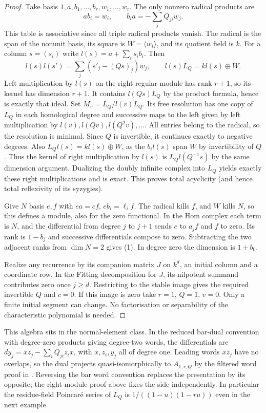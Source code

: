 \documentclass[11pt]{article}
\begin{document}
\begin{proof}
Take basis $1,a,b_1,\ldots,b_r,w_1,\ldots,w_r$. The only nonzero
radical products are
\[
              a b_i=w_i,\qquad b_i a=-\sum_j Q_{ji}w_j .
\]
This table is associative since all triple radical products vanish.
The radical is the span of the nonunit basis, its square is
$W=\langle w_i\rangle$, and its quotient field is $k$.
For a column $s=(s_i)$ write $l(s)=a+\sum_i s_i b_i$. Then
\[
 l(s)l(s')=\sum_j(s'_j-(Qs)_j)w_j,\qquad
 l(s)L_Q=k l(s)\oplus W.
\]
Left multiplication by $l(s)$ on the right regular module has rank
$r+1$, so its kernel has dimension $r+1$. It contains
$l(Qs)L_Q$ by the product formula, hence is exactly that ideal.
Set $M_v=L_Q/l(v)L_Q$. Its free resolution has one copy of $L_Q$
in each homological degree and successive maps to the left given
by left multiplication by $l(v),l(Qv),l(Q^2v),\ldots$.
All entries belong to the radical, so the resolution is minimal.
Since $Q$ is invertible, it continues exactly to negative degrees.
Also $L_Q l(s)=k l(s)\oplus W$, as the $b_i l(s)$ span $W$ by
invertibility of $Q$. Thus the kernel of right multiplication by
$l(s)$ is $L_Q l(Q^{-1}s)$ by the same dimension argument.
Dualizing the doubly infinite complex into $L_Q$ yields exactly
these right multiplications and is exact. This proves total acyclicity
(and hence total reflexivity of its syzygies).

Give $N$ basis $e,f$ with $e a=c f$, $e b_i=\ell_i f$.
The radical kills $f$, and $W$ kills $N$, so this defines a module,
also for the zero functional. In the Hom complex each term is $N$,
and the differential from degree $j$ to $j+1$ sends $e$ to $a_jf$
and $f$ to zero. Its rank is $1-b_j$ and successive differentials
compose to zero. Subtracting the two adjacent ranks from $\dim N=2$
gives (1). In degree zero the dimension is $1+b_0$.

Realize any recurrence by its companion matrix $J$ on $k^d$, an
initial column and a coordinate row. In the Fitting decomposition
for $J$, its nilpotent summand contributes zero once $j\ge d$.
Restricting to the stable image gives the required invertible $Q$
and $c=0$. If this image is zero take $r=1$, $Q=1$, $v=0$.
Only a finite initial segment can change. No factorisation or
separability of the characteristic polynomial is needed.
\end{proof}

This algebra sits in the normal-element class. In the reduced bar-dual
convention with degree-zero products giving degree-two words, the
differentials are $dy_j=xz_j-\sum_i Q_{ji}z_i x$, with $x,z_i,y_j$
all of degree one. Leading words $xz_j$ have no overlaps, so the
dual projects quasi-isomorphically to $A_{1,r,Q}$ by the filtered
word proof in . Reversing the
bar word convention replaces the presentation by its opposite; the
right-module proof above fixes the side independently. In particular
the residue-field Poincar\'e series of $L_Q$ is
$1/((1-u)(1-r u))$ even in the next example.
\end{document}
